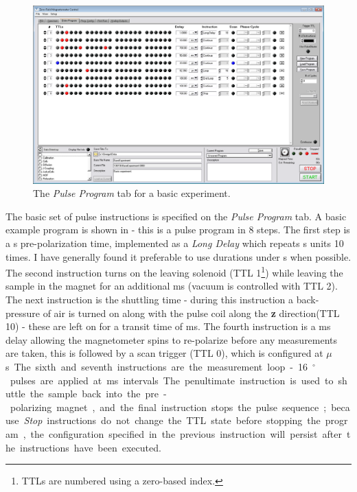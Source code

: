 \documentclass[PaulGanssle-Thesis.tex]{subfiles}
\begin{document}
\begin{figure}[!h]
\includegraphics[width=\textwidth]{figures/console/pulse_program_1d.png}
\caption{The \textit{Pulse Program} tab for a basic experiment.}
\label{fig:PulseProgramTab1d}
\end{figure}

The basic set of pulse instructions is specified on the \textit{Pulse Program} tab. A basic example program is shown in  - this is a pulse program in 8 steps. The first step is a \unit[10]{s} pre-polarization time, implemented as a \textit{Long Delay} which repeats \unit[1]{s} units 10 times. I have generally found it preferable to use durations under \unit[5]{s} when possible. The second instruction turns on the leaving solenoid (TTL 1\footnote{TTLs are numbered using a zero-based index.}) while leaving the sample in the magnet for an additional \unit[10]{ms} (vacuum is controlled with TTL 2). The next instruction is the shuttling time - during this instruction a back-pressure of air is turned on along with the pulse coil along the \textbf{z} direction(TTL 10) - these are left on for a transit time of \unit[700]{ms}. The fourth instruction is a \unit[50]{ms} delay allowing the magnetometer spins to re-polarize before any measurements are taken, this is followed by a scan trigger (TTL 0), which is configured at \unit[20]{$\mu$s}. The sixth and seventh instructions are the measurement loop - 16 \unit[180]{$^\circ$} pulses are applied at \unit[100]{ms} intervals. The penultimate instruction is used to shuttle the sample back into the pre-polarizing magnet, and the final instruction stops the pulse sequence; because \textit{Stop} instructions do not change the TTL state before stopping the program, the configuration specified in the previous instruction will persist after the instructions have been executed.
\end{document}
